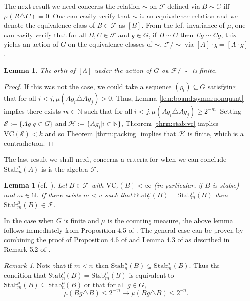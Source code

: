 \documentclass[11pt]{amsart}
\newtheorem{lemma}[theorem]{Lemma}
\theoremstyle{definition}
\theoremstyle{remark}
\newtheorem{remark}[theorem]{Remark}
\def\NN{\mathbb{N}}
\begin{document}
The next result we need  concerns the relation $\sim$ on $\mathcal{F}$ defined via $B \sim C$ iff $\mu(B \triangle C)=0$. One can easily verify that $\sim$ is an equivalence relation and we denote the equivalence class of $B \in \mathcal{F}$ as $[B]$. From the left invariance of $\mu$, one can easily verify that for all $B, C \in \mathcal{F}$ and $g \in G$, if $B \sim C$ then $Bg \sim Cg$, this yields an action of $G$ on the equivalence classes of $\sim$, $\mathcal{F}/\sim$ via $[A]\cdot g = [A\cdot g]$. 

\begin{lemma}
\label{lem:fin:orbit:nonquant}
    The orbit of $[A]$ under the action of $G$ on $\mathcal{F}/\sim$ is finite.
\end{lemma}
\begin{proof}
If this was not the case, we could take a sequence $(g_i) \subseteq G$ satisfying that for all $i < j, \mu(Ag_i \triangle Ag_j) >0$. Thus, Lemma \ref{lem:bound:symm:nonquant} implies there exists $m \in \NN$ such that for all $i < j, \mu(Ag_i \triangle Ag_j) \ge 2^{-m}$. Setting $\mathcal{S}:= \{Ag|g \in G\}$ and $\mathcal{H}:= \{Ag_i|i \in \NN\}$, Theorem \ref{thrm:stab:vc} implies $\mathrm{VC}(\mathcal{S}) < k$ and so Theorem \ref{thrm:packing} implies that $\mathcal{H}$ is finite, which is a contradiction.
\end{proof}
The last result we shall need, concerns a criteria for when we can conclude $\mathrm{Stab}_m^\mu(A)$ is is the algebra $\mathcal{F}$.
\begin{lemma}[cf.\ \cite{conant2021quantitative}]
\label{lem:Stab:in:F}
    Let $B \in \mathcal{F}$ with $\mathrm{VC}_r(B) < \infty$ (in particular, if $B$ is stable) and $m \in \NN$. If there exists $m< n$ such that $\mathrm{Stab}_n^\mu(B) = \mathrm{Stab}_m^\mu(B)$ then $\mathrm{Stab}_m^\mu(B) \in \mathcal{F}$. 
\end{lemma}
In the case when $G$ is finite and $\mu$ is the counting measure, the above lemma follows immediately from Proposition 4.5 of \cite{conant2021quantitative}. The general case can be proven by combining the proof of Proposition 4.5 of \cite{conant2021quantitative} and Lemma 4.3 of \cite{chernikov2016definable} as described in Remark 5.2 of \cite{conant2021quantitative}.
\begin{remark}
    Note that if $m < n$ then $\mathrm{Stab}_n^\mu(B) \subseteq \mathrm{Stab}_m^\mu(B)$. Thus the condition that $\mathrm{Stab}_n^\mu(B) = \mathrm{Stab}_m^\mu(B)$ is equivalent to $\mathrm{Stab}_m^\mu(B) \subseteq \mathrm{Stab}_n^\mu(B)$ or that for all $g \in G$, 
    \[
    \mu(Bg \triangle B) \le 2^{-m} \to  \mu(Bg \triangle B) \le 2^{-n}.
    \]
\end{remark}
\end{document}
